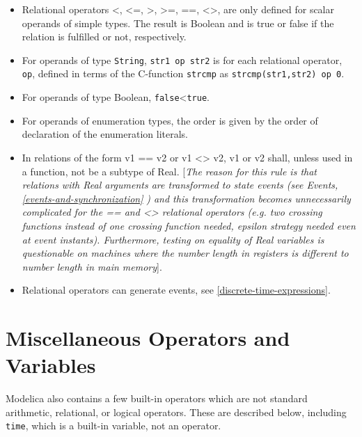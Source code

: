 \begin{itemize}
\item
  Relational operators \textless{}, \textless{}=, \textgreater{},
  \textgreater{}=, ==, \textless{}\textgreater{}, are only defined for
  scalar operands of simple types. The result is Boolean and is true or
  false if the relation is fulfilled or not, respectively.
\item
  For operands of type \lstinline[basicstyle=\ttfamily]!String!, \lstinline[basicstyle=\ttfamily]!str1 op str2! is for each relational
  operator, \lstinline[basicstyle=\ttfamily]!op!, defined in terms of the C-function \lstinline[basicstyle=\ttfamily]!strcmp! as
  \lstinline[basicstyle=\ttfamily]!strcmp(str1,str2) op 0!.
\item
  For operands of type Boolean, 
\lstinline[basicstyle=\ttfamily]!false!\textless{}\lstinline[basicstyle=\ttfamily]!true!.
\item
  For operands of enumeration types, the order is given by the order of
  declaration of the enumeration literals.
\item
  In relations of the form v1 == v2 or v1 \textless{}\textgreater{} v2,
  v1 or v2 shall, unless used in a function, not be a subtype of Real.
  {[}\emph{The reason for this rule is that relations with Real
  arguments are transformed to state events (see Events, \autoref{events-and-synchronization}}
  \emph{) and this transformation becomes unnecessarily complicated
  for the == and \textless{}\textgreater{} relational operators (e.g.
  two crossing functions instead of one crossing function needed,
  epsilon strategy needed even at event instants). Furthermore, testing
  on equality of Real variables is questionable on machines where the
  number length in registers is different to number length in main
  memory}{]}.
\item
  Relational operators can generate events, see \autoref{discrete-time-expressions}.
\end{itemize}

\section{Miscellaneous Operators and Variables}

Modelica also contains a few built-in operators which are not standard
arithmetic, relational, or logical operators. These are described below,
including \lstinline[basicstyle=\ttfamily]!time!, which is a built-in variable, not an operator.

